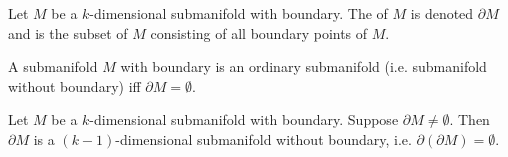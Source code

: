\documentclass[notoc,notitlepage]{tufte-book}
\begin{document}
\begin{defn}\label{defn:boundary_of_a_submanifold}
  Let $M$ be a $k$-dimensional submanifold with boundary. The 
  of $M$ is denoted $\partial M$ and is the subset of $M$ consisting of all
  boundary points of $M$.
\end{defn}

\begin{note}
  A submanifold $M$ with boundary is an ordinary submanifold (i.e. submanifold
  without boundary) iff $\partial M = \emptyset$.
\end{note}

\begin{propo}\label{propo:dimension_of_the_boundary_of_a_submanifold}
  Let $M$ be a $k$-dimensional submanifold with boundary. Suppose $\partial M
  \neq \emptyset$. Then $\partial M$ is a $(k - 1)$-dimensional submanifold
  without boundary, i.e. $\partial(\partial M) = \emptyset$.
\end{propo}
\end{document}
